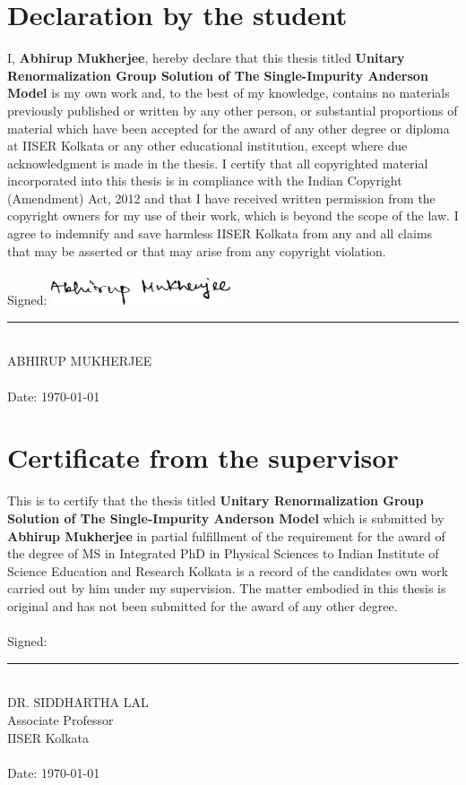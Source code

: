 \documentclass[twoside]{report}
\numberwithin{equation}{section}
\begin{document}
\chapter*{Declaration by the student}
I, {\large\textbf{Abhirup Mukherjee}}, hereby declare that this thesis titled {\large\textbf{Unitary Renormalization Group Solution of The Single-Impurity Anderson Model}} is my own work and, to the best of my knowledge, contains no materials previously published or written by any other person, or substantial proportions of material which have been accepted for the award of any other degree or diploma at IISER Kolkata or any other educational institution, except where due acknowledgment is made in the thesis. I certify that all copyrighted material incorporated into this thesis is in compliance with the Indian Copyright (Amendment) Act, 2012 and that I have received written permission from the copyright owners for my use of their work, which is beyond the scope of the law. I agree to indemnify and save harmless IISER Kolkata from any and all claims that may be asserted or that may arise from any copyright violation.
\\\\
Signed:
\hspace{30pt}\includegraphics[width=150pt]{../figures/signature_black.png}
\\
\rule[1em]{0.5\linewidth}{0.5pt}\\  %
ABHIRUP MUKHERJEE
\\\\
Date:
\today

\chapter*{Certificate from the supervisor}
This is to certify that the thesis titled {\large\textbf{Unitary Renormalization Group Solution of The Single-Impurity Anderson Model}} which is submitted by {\large\textbf{Abhirup Mukherjee}} in partial fulfillment of the requirement for the award of the degree of MS in Integrated PhD in Physical Sciences to Indian Institute of Science Education and Research Kolkata is a record of the candidates own work carried out by him under my supervision. The matter embodied in this thesis is original and has not been submitted for the award of any other degree.
\\\\
Signed:\\[10pt]
\rule[1em]{0.5\linewidth}{0.5pt}\\  %
DR. SIDDHARTHA LAL\\
Associate Professor\\
IISER Kolkata
\\\\
Date:
\today
\end{document}
